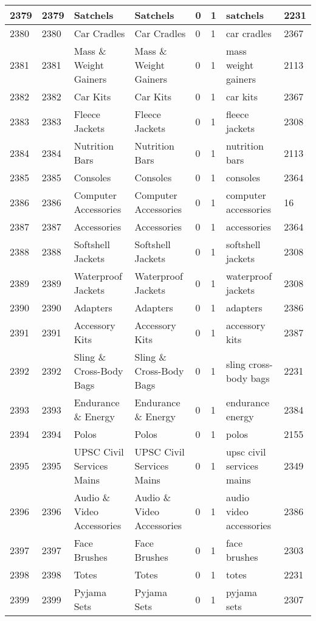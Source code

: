 \begin{longtable}{|l|l|l|l|l|l|l|l|}
2379 & 2379 & Satchels & Satchels & 0 & 1 & satchels & 2231 \\ \hline 
2380 & 2380 & Car Cradles & Car Cradles & 0 & 1 & car cradles & 2367 \\ \hline 
2381 & 2381 & Mass \& Weight Gainers & Mass \& Weight Gainers & 0 & 1 & mass weight gainers & 2113 \\ \hline 
2382 & 2382 & Car Kits & Car Kits & 0 & 1 & car kits & 2367 \\ \hline 
2383 & 2383 & Fleece Jackets & Fleece Jackets & 0 & 1 & fleece jackets & 2308 \\ \hline 
2384 & 2384 & Nutrition Bars & Nutrition Bars & 0 & 1 & nutrition bars & 2113 \\ \hline 
2385 & 2385 & Consoles & Consoles & 0 & 1 & consoles & 2364 \\ \hline 
2386 & 2386 & Computer Accessories & Computer Accessories & 0 & 1 & computer accessories & 16 \\ \hline 
2387 & 2387 & Accessories & Accessories & 0 & 1 & accessories & 2364 \\ \hline 
2388 & 2388 & Softshell Jackets & Softshell Jackets & 0 & 1 & softshell jackets & 2308 \\ \hline 
2389 & 2389 & Waterproof Jackets & Waterproof Jackets & 0 & 1 & waterproof jackets & 2308 \\ \hline 
2390 & 2390 & Adapters & Adapters & 0 & 1 & adapters & 2386 \\ \hline 
2391 & 2391 & Accessory Kits & Accessory Kits & 0 & 1 & accessory kits & 2387 \\ \hline 
2392 & 2392 & Sling \& Cross-Body Bags & Sling \& Cross-Body Bags & 0 & 1 & sling cross-body bags & 2231 \\ \hline 
2393 & 2393 & Endurance \& Energy & Endurance \& Energy & 0 & 1 & endurance energy & 2384 \\ \hline 
2394 & 2394 & Polos & Polos & 0 & 1 & polos & 2155 \\ \hline 
2395 & 2395 & UPSC Civil Services Mains & UPSC Civil Services Mains & 0 & 1 & upsc civil services mains & 2349 \\ \hline 
2396 & 2396 & Audio \& Video Accessories & Audio \& Video Accessories & 0 & 1 & audio video accessories & 2386 \\ \hline 
2397 & 2397 & Face Brushes & Face Brushes & 0 & 1 & face brushes & 2303 \\ \hline 
2398 & 2398 & Totes & Totes & 0 & 1 & totes & 2231 \\ \hline 
2399 & 2399 & Pyjama Sets & Pyjama Sets & 0 & 1 & pyjama sets & 2307 \\ \hline 

\end{longtable}
